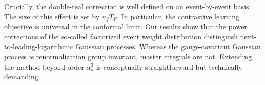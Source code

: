 Crucially, the double-real correction is well defined on an
event-by-event basis. The size of this effect is set by $n_f T_F$. In
particular, the contrastive learning objective is universal in the
conformal limit. Our results show that the power corrections of the
so-called factorized event weight distribution distinguish
next-to-leading-logarithmic Gaussian processes. Whereas the
gauge-covariant Gaussian process is renormalization group invariant,
master integrals are not. Extending the method beyond order $\alpha_s^3$
is conceptually straightforward but technically demanding.

